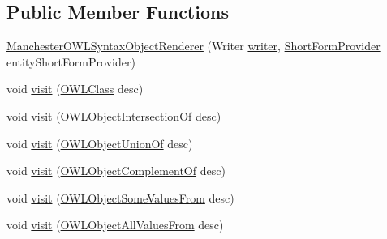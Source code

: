\subsection*{Public Member Functions}
\begin{DoxyCompactItemize}
\item 
\hyperlink{classuk_1_1ac_1_1manchester_1_1cs_1_1owl_1_1owlapi_1_1mansyntaxrenderer_1_1_manchester_o_w_l_syntax_object_renderer_a686757ef2d6dd5225380b39ada40fbd8}{Manchester\-O\-W\-L\-Syntax\-Object\-Renderer} (Writer \hyperlink{classuk_1_1ac_1_1manchester_1_1cs_1_1owl_1_1owlapi_1_1mansyntaxrenderer_1_1_abstract_renderer_aa1198fed3e789d2e588e8c5708ecd539}{writer}, \hyperlink{interfaceorg_1_1semanticweb_1_1owlapi_1_1util_1_1_short_form_provider}{Short\-Form\-Provider} entity\-Short\-Form\-Provider)
\item 
void \hyperlink{classuk_1_1ac_1_1manchester_1_1cs_1_1owl_1_1owlapi_1_1mansyntaxrenderer_1_1_manchester_o_w_l_syntax_object_renderer_a9140e5750c9ea5b02245ebaf31b5205c}{visit} (\hyperlink{interfaceorg_1_1semanticweb_1_1owlapi_1_1model_1_1_o_w_l_class}{O\-W\-L\-Class} desc)
\item 
void \hyperlink{classuk_1_1ac_1_1manchester_1_1cs_1_1owl_1_1owlapi_1_1mansyntaxrenderer_1_1_manchester_o_w_l_syntax_object_renderer_a88d49951c6489250139423374457ed31}{visit} (\hyperlink{interfaceorg_1_1semanticweb_1_1owlapi_1_1model_1_1_o_w_l_object_intersection_of}{O\-W\-L\-Object\-Intersection\-Of} desc)
\item 
void \hyperlink{classuk_1_1ac_1_1manchester_1_1cs_1_1owl_1_1owlapi_1_1mansyntaxrenderer_1_1_manchester_o_w_l_syntax_object_renderer_ac47a1b29fe8286f967cfedb673a2e45d}{visit} (\hyperlink{interfaceorg_1_1semanticweb_1_1owlapi_1_1model_1_1_o_w_l_object_union_of}{O\-W\-L\-Object\-Union\-Of} desc)
\item 
void \hyperlink{classuk_1_1ac_1_1manchester_1_1cs_1_1owl_1_1owlapi_1_1mansyntaxrenderer_1_1_manchester_o_w_l_syntax_object_renderer_a991ae87177aa316604e658ad75f9fc6d}{visit} (\hyperlink{interfaceorg_1_1semanticweb_1_1owlapi_1_1model_1_1_o_w_l_object_complement_of}{O\-W\-L\-Object\-Complement\-Of} desc)
\item 
void \hyperlink{classuk_1_1ac_1_1manchester_1_1cs_1_1owl_1_1owlapi_1_1mansyntaxrenderer_1_1_manchester_o_w_l_syntax_object_renderer_af8108094f2ed76c0d5ec5a337a9b8047}{visit} (\hyperlink{interfaceorg_1_1semanticweb_1_1owlapi_1_1model_1_1_o_w_l_object_some_values_from}{O\-W\-L\-Object\-Some\-Values\-From} desc)
\item 
void \hyperlink{classuk_1_1ac_1_1manchester_1_1cs_1_1owl_1_1owlapi_1_1mansyntaxrenderer_1_1_manchester_o_w_l_syntax_object_renderer_ae0790863ceb9d0419ff15e9378313745}{visit} (\hyperlink{interfaceorg_1_1semanticweb_1_1owlapi_1_1model_1_1_o_w_l_object_all_values_from}{O\-W\-L\-Object\-All\-Values\-From} desc)

\end{DoxyCompactItemize}
